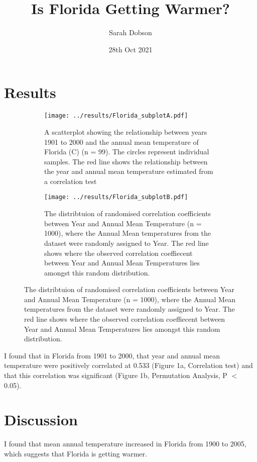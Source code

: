 \documentclass[10pt]{article}
\title{Is Florida Getting Warmer?}
\author{Sarah Dobson}
\date{28th Oct 2021}
\begin{document}
  \maketitle
  \section{Results}
  
  \begin{figure}[!htbp] 
  \centering
\begin{subfigure}{.4\textwidth}
  \centering
  \texttt{[image: ../results/Florida\_subplotA.pdf]}
    \caption{\footnotesize A scatterplot showing the relationship between years 1901 to 2000 and the annual mean temperature of Florida  (\textdegree{}C) (n = 99). The circles represent individual samples. The red line shows the relationship between the year and annual mean temperature estimated from a correlation test }
  \label{fig:Figure 1a}
\end{subfigure}
 \hspace{1em}
\begin{subfigure}{.4\textwidth}
  \centering
  \texttt{[image: ../results/Florida\_subplotB.pdf]}
    \caption{\footnotesize The distribtuion of randomised correlation coefficients between Year and Annual Mean Temperature (n = 1000), where the Annual Mean temperatures from the dataset were randomly assigned to Year. The red line shows where the observed correlation coeffiecent between Year and Annual Mean Temperatures lies amongst this random distribution.}
  \label{fig:Figure 1b}
\end{subfigure}
\end{figure}

  
  I found that in Florida from 1901 to 2000, that year and annual mean temperature were positively correlated at 0.533 (Figure 1a, Correlation test) and that this correlation was significant (Figure 1b, Permutation Analysis, P $<$ 0.05). 

  \section{Discussion}
  
I found that mean annual temperature increased in Florida from 1900 to 2005, which suggests that Florida is getting warmer.

 
\end{document}
